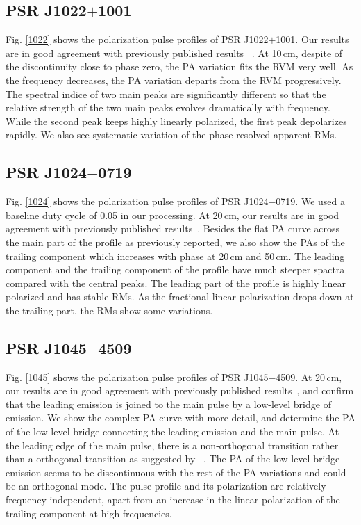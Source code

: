 \documentclass[useAMS,usenatbib]{mn2e}
\begin{document}
\subsection{PSR J1022$+$1001}

Fig. \ref{1022} shows the polarization pulse profiles 
of PSR J1022$+$1001.
%
Our results are in good agreement with previously published results
~\citep{1022Kramer99,Stairs99,Ord04,Yan11}.
%
At 10\,cm, despite of the discontinuity close to phase zero, the PA variation 
fits the RVM very well. As the frequency decreases, the PA variation 
departs from the RVM progressively.
%
The spectral indice of two main peaks are significantly different so that 
the relative strength of the two main peaks evolves dramatically with 
frequency.
%
While the second peak keeps highly linearly polarized, the first peak 
depolarizes rapidly.
%
We also see systematic variation of the phase-resolved apparent RMs.


%
\subsection{PSR J1024$-$0719}

Fig. \ref{1024} shows the polarization pulse profiles of 
PSR J1024$-$0719.
%
We used a baseline duty cycle of 0.05 in our processing.
%
At 20\,cm, our results are in good agreement with previously published
results~\citep{Ord04,Yan11}. 
%
Besides the flat PA curve across the main part of the profile as 
previously reported, we also show the PAs of the trailing component which 
increases with phase at 20\,cm and 50\,cm.
%
The leading component and the trailing component of the profile have much 
steeper spactra compared with the central peaks. 
%
The leading part of the profile is highly linear polarized and has stable  
RMs. As the fractional linear polarization drops down at the 
trailing part, the RMs show some variations.

%
\subsection{PSR J1045$-$4509}

Fig. \ref{1045} shows the polarization pulse profiles of 
PSR J1045$-$4509.
%
At 20\,cm, our results are in good agreement with previously published
results~\citep{Yan11}, and confirm that the leading emission is joined to 
the main pulse by a low-level bridge of emission.
%
We show the complex PA curve with more detail, and determine the PA of the 
low-level bridge connecting the leading emission and the main pulse.
%
At the leading edge of the main pulse, there is a non-orthogonal transition 
rather than a orthogonal transition as suggested by ~\citet{Yan11}.
%
The PA of the low-level bridge emission seems to be discontinuous with 
the rest of the PA variations and could be an orthogonal mode.
%
The pulse profile and its polarization are relatively frequency-independent, 
apart from an increase in the linear polarization of the trailing 
component at high frequencies.
\end{document}
